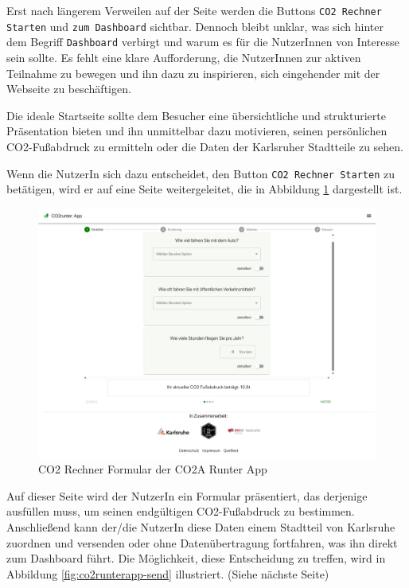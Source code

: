 Erst nach längerem Verweilen auf der Seite werden die Buttons \texttt{CO2 Rechner Starten} und \texttt{zum Dashboard} sichtbar. Dennoch bleibt unklar, was sich hinter dem Begriff \texttt{Dashboard} verbirgt und warum es für die NutzerInnen von Interesse sein sollte. Es fehlt eine klare Aufforderung, die NutzerInnen zur aktiven Teilnahme zu bewegen und ihn dazu zu inspirieren, sich eingehender mit der Webseite zu beschäftigen.

Die ideale Startseite sollte dem Besucher eine übersichtliche und strukturierte Präsentation bieten und ihn unmittelbar dazu motivieren, seinen persönlichen CO2-Fußabdruck zu ermitteln oder die Daten der Karlsruher Stadtteile zu sehen.

Wenn die NutzerIn sich dazu entscheidet, den Button \texttt{CO2 Rechner Starten} zu betätigen, wird er auf eine Seite weitergeleitet, die in Abbildung \ref{fig:co2runterapp-rechner} dargestellt ist.

\begin{figure}[h]
    \centering
    \includegraphics[width=1\textwidth]{images/02/CO2-Runter-App-Rechner.jpeg}
    \caption{CO2 Rechner Formular der CO2A Runter App}
    \label{fig:co2runterapp-rechner}
\end{figure}

Auf dieser Seite wird der NutzerIn ein Formular präsentiert, das derjenige ausfüllen muss, um seinen endgültigen CO2-Fußabdruck zu bestimmen. Anschließend kann der/die NutzerIn diese Daten einem Stadtteil von Karlsruhe zuordnen und versenden oder ohne Datenübertragung fortfahren, was ihn direkt zum Dashboard führt. Die Möglichkeit, diese Entscheidung zu treffen, wird in Abbildung \ref{fig:co2runterapp-send} illustriert. (Siehe nächste Seite)

